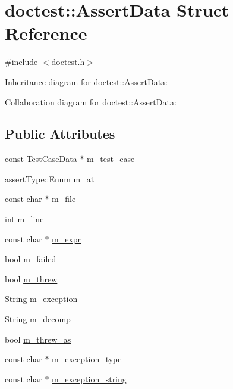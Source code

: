\hypertarget{structdoctest_1_1AssertData}{}\section{doctest\+:\+:Assert\+Data Struct Reference}
\label{structdoctest_1_1AssertData}


{\ttfamily \#include $<$doctest.\+h$>$}



Inheritance diagram for doctest\+:\+:Assert\+Data\+:


Collaboration diagram for doctest\+:\+:Assert\+Data\+:
\subsection*{Public Attributes}
\begin{DoxyCompactItemize}
\item 
const \hyperlink{structdoctest_1_1TestCaseData}{Test\+Case\+Data} $\ast$ \hyperlink{structdoctest_1_1AssertData_ab26ee6e05feaefc982c4f5481458cbda}{m\+\_\+test\+\_\+case}
\item 
\hyperlink{namespacedoctest_1_1assertType_ae1bb5bed722f34f1c38b83cb19d326d3}{assert\+Type\+::\+Enum} \hyperlink{structdoctest_1_1AssertData_a0b3b2866b13ba048c0beea51bd798749}{m\+\_\+at}
\item 
const char $\ast$ \hyperlink{structdoctest_1_1AssertData_ac22c9ed0d8c6edec58c4b26a0a00e714}{m\+\_\+file}
\item 
int \hyperlink{structdoctest_1_1AssertData_a1142f5fb5d171964b7677a9d23f81548}{m\+\_\+line}
\item 
const char $\ast$ \hyperlink{structdoctest_1_1AssertData_af8fe9e24ffba3f575c7384a85f96297a}{m\+\_\+expr}
\item 
bool \hyperlink{structdoctest_1_1AssertData_ac9ddaf3e6532fdadba3c1f74eb931d4a}{m\+\_\+failed}
\item 
bool \hyperlink{structdoctest_1_1AssertData_a3e9d4c7eeff7c4fe310b0597bf7027b8}{m\+\_\+threw}
\item 
\hyperlink{classdoctest_1_1String}{String} \hyperlink{structdoctest_1_1AssertData_a1fdbef933ef26c0bc174f9ec716924cd}{m\+\_\+exception}
\item 
\hyperlink{classdoctest_1_1String}{String} \hyperlink{structdoctest_1_1AssertData_a1c6b5804b7dd4d8ba70126cb598f30bd}{m\+\_\+decomp}
\item 
bool \hyperlink{structdoctest_1_1AssertData_ace744d365532d299052c8a80a63f7079}{m\+\_\+threw\+\_\+as}
\item 
const char $\ast$ \hyperlink{structdoctest_1_1AssertData_a1c476dc606780aefdb7db2d7ca146199}{m\+\_\+exception\+\_\+type}
\item 
const char $\ast$ \hyperlink{structdoctest_1_1AssertData_aa01e5c79855d78e3612b6d77a0fef54b}{m\+\_\+exception\+\_\+string}
\end{DoxyCompactItemize}


